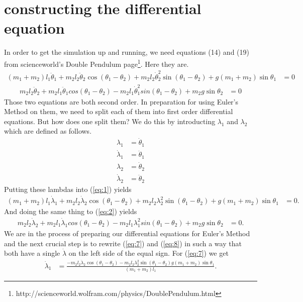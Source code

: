 \documentclass[paper=a4, fontsize=11pt]{scrartcl} %
\numberwithin{equation}{section} %
\numberwithin{figure}{section} %
\numberwithin{table}{section} %
\begin{document}
\section{constructing the differential equation}
In order to get the simulation up and running, we need equations (14) and (19) from scienceworld's Double Pendulum page\footnote{http://scienceworld.wolfram.com/physics/DoublePendulum.html}.
Here they are.
\begin{align} \label{eq:1}
  (m_1 + m_2) l_1 \ddot{\theta}_1 + m_2 l_2 \ddot{\theta}_2 \cos(\theta_1 - \theta_2)
  + m_2 l_2 \dot{\theta}^2_2 \sin(\theta_1 - \theta_2) + g (m_1 + m_2) \sin \theta_1 &= 0
\end{align}
\begin{align} \label{eq:2}
  m_2 l_2 \ddot{\theta}_2 + m_2 l_1 \ddot{\theta}_1 cos(\theta_1 - \theta_2)
  - m_2 l_1 \dot{\theta}^2_1 sin(\theta_1 - \theta_2) + m_2 g \sin \theta_2 &= 0
\end{align}
Those two equations are both second order. In preparation for using Euler's Method on them, we need to split each of them into first order differential equations.
But how does one split them? We do this by introducting $\lambda_1$ and $\lambda_2$ which are defined as follows.
\begin{align} 
  \lambda_1 &= \dot{\theta}_1 \label{eq:3} \\
  \dot{\lambda}_1 &= \ddot{\theta}_1 \label{eq:4}
  \\
  \lambda_2 &= \dot{\theta}_2 \label{eq:5} \\
  \dot{\lambda}_2 &= \ddot{\theta}_2 \label{eq:6}
\end{align}
Putting these lambdas into (\ref{eq:1}) yields
\begin{align} \label{eq:7}
  (m_1 + m_2) l_1 \dot{\lambda}_1 + m_2 l_2 \dot{\lambda}_2 \cos(\theta_1 - \theta_2)
  + m_2 l_2 \lambda^2_2 \sin(\theta_1 - \theta_2) + g (m_1 + m_2) \sin \theta_1 &= 0.
\end{align}
And doing the same thing to (\ref{eq:2}) yields
\begin{align} \label{eq:8}
  m_2 l_2 \dot{\lambda}_2 + m_2 l_1 \dot{\lambda}_1 cos(\theta_1 - \theta_2)
  - m_2 l_1 \lambda^2_1 sin(\theta_1 - \theta_2) + m_2 g \sin \theta_2 &= 0.
\end{align}
We are in the process of preparing our differential equations for Euler's Method and the next crucial step is to rewrite (\ref{eq:7}) and (\ref{eq:8})
in such a way that both have a single $\dot{\lambda}$ on the left side of the equal sign. For (\ref{eq:7}) we get
\begin{align} \label{eq:9}
   \dot{\lambda}_1 &= \frac{- m_2 l_2 \dot{\lambda}_2 \cos(\theta_1 - \theta_2) - m_2 l_2 \lambda^2_2 \sin(\theta_1 - \theta_2) g (m_1 + m_2) \sin \theta_1}{(m_1 + m_2) l_1}.
\end{align}
\end{document}
